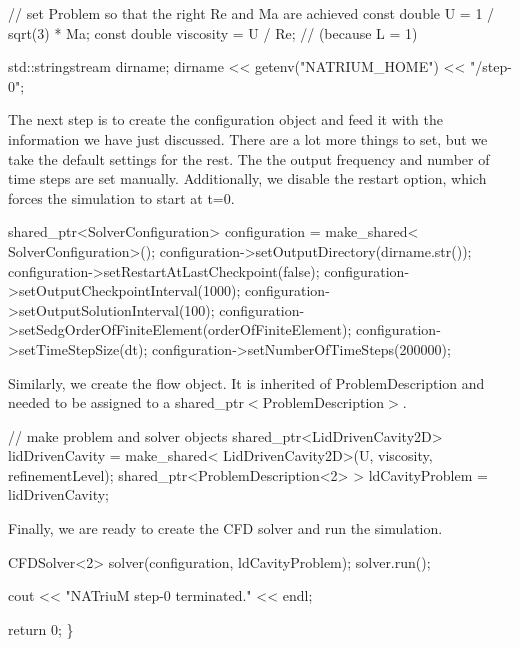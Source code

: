 \begin{DoxyCodeInclude}
        \textcolor{comment}{// set Problem so that the right Re and Ma are achieved}
        \textcolor{keyword}{const} \textcolor{keywordtype}{double} U = 1 / sqrt(3) * Ma;
        \textcolor{keyword}{const} \textcolor{keywordtype}{double} viscosity = U / Re; \textcolor{comment}{// (because L = 1)}

        std::stringstream dirname;
        dirname << getenv(\textcolor{stringliteral}{"NATRIUM\_HOME"}) << \textcolor{stringliteral}{"/step-0"};
\end{DoxyCodeInclude}
 The next step is to create the configuration object and feed it with the information we have just discussed. There are a lot more things to set, but we take the default settings for the rest. The the output frequency and number of time steps are set manually. Additionally, we disable the restart option, which forces the simulation to start at t=0. 
\begin{DoxyCodeInclude}
        shared\_ptr<SolverConfiguration> configuration = make\_shared<
                        SolverConfiguration>();
        configuration->setOutputDirectory(dirname.str());
        configuration->setRestartAtLastCheckpoint(\textcolor{keyword}{false});
        configuration->setOutputCheckpointInterval(1000);
        configuration->setOutputSolutionInterval(100);
        configuration->setSedgOrderOfFiniteElement(orderOfFiniteElement);
        configuration->setTimeStepSize(dt);
        configuration->setNumberOfTimeSteps(200000);
\end{DoxyCodeInclude}
 Similarly, we create the flow object. It is inherited of Problem\-Description and needed to be assigned to a shared\-\_\-ptr$<$\-Problem\-Description$>$. 
\begin{DoxyCodeInclude}
        \textcolor{comment}{// make problem and solver objects}
        shared\_ptr<LidDrivenCavity2D> lidDrivenCavity = make\_shared<
                        LidDrivenCavity2D>(U, viscosity, refinementLevel);
        shared\_ptr<ProblemDescription<2> > ldCavityProblem = lidDrivenCavity;
\end{DoxyCodeInclude}
 Finally, we are ready to create the C\-F\-D solver and run the simulation. 
\begin{DoxyCodeInclude}
        CFDSolver<2> solver(configuration, ldCavityProblem);
        solver.run();

        cout << \textcolor{stringliteral}{"NATriuM step-0 terminated."} << endl;

        \textcolor{keywordflow}{return} 0;
\}

\end{DoxyCodeInclude}


